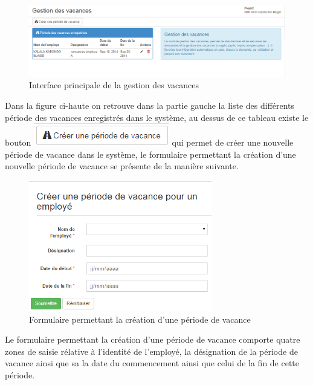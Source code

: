 \documentclass[12pt,a4paper]{report}
\begin{document}
\begin{figure}[h]
\begin{center}
\includegraphics[width=14cm]{pic/MainVacance.png}
\end{center}
\caption{Interface principale de la gestion des vacances}
\label{Interface principale de la gestion des vacances}
\end{figure}

Dans la figure ci-haute on retrouve dans la partie gauche la liste des différents période des vacances enregistrés dans le système, au dessus de ce tableau existe le bouton \includegraphics[scale=1]{pic/CreateVacance.png} qui permet de créer une nouvelle période de vacance dans le système, le formulaire permettant la création d'une nouvelle période de vacance se présente de la manière suivante.

\begin{figure}[h]
\begin{center}
\includegraphics[width=8cm]{pic/CreateHolly.png}
\end{center}
\caption{Formulaire permettant la création d'une période de vacance}
\label{Formulaire permettant la création d'une période de vacance}
\end{figure} 

Le formulaire permettant la création d'une période de vacance comporte quatre zones de saisie rélative à l'identité de l'employé, la désignation de la période de vacance  ainsi que sa la date du commencement ainsi que celui de la fin de cette période.
\end{document}
